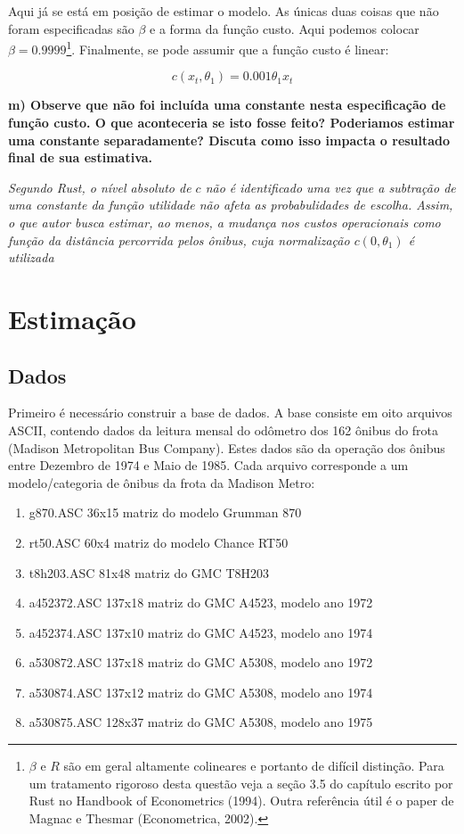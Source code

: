 \documentclass[12pt,a4paper]{article}
\providecommand{\tightlist}{%
  \setlength{\itemsep}{0pt}\setlength{\parskip}{0pt}}
\let\rmarkdownfootnote\footnote%
\def\footnote{\protect\rmarkdownfootnote}
\begin{document}
Aqui já se está em posição de estimar o modelo. As únicas duas coisas
que não foram especificadas são \(\beta\) e a forma da função custo.
Aqui podemos colocar \(\beta = 0.9999\)\footnote{\(\beta\) e \(R\) são
  em geral altamente colineares e portanto de difícil distinção. Para um
  tratamento rigoroso desta questão veja a seção 3.5 do capítulo escrito
  por Rust no Handbook of Econometrics (1994). Outra referência útil é o
  paper de Magnac e Thesmar (Econometrica, 2002).}. Finalmente, se pode
assumir que a função custo é linear:

\[
c (x_t, \theta_1) = 0.001 \theta_1 x_t
\]

\textbf{m) Observe que não foi incluída uma constante nesta
especificação de função custo. O que aconteceria se isto fosse feito?
Poderiamos estimar uma constante separadamente? Discuta como isso
impacta o resultado final de sua estimativa.}

\emph{Segundo Rust, o nível absoluto de \(c\) não é identificado uma vez
que a subtração de uma constante da função utilidade não afeta as
probabulidades de escolha. Assim, o que autor busca estimar, ao menos, a
mudança nos custos operacionais como função da distância percorrida
pelos ônibus, cuja normalização \(c(0,\theta_1)\) é utilizada}

\hypertarget{estimacao}{%
\section{Estimação}\label{estimacao}}

\hypertarget{dados}{%
\subsection{Dados}\label{dados}}

Primeiro é necessário construir a base de dados. A base consiste em oito
arquivos ASCII, contendo dados da leitura mensal do odômetro dos 162
ônibus do frota (Madison Metropolitan Bus Company). Estes dados são da
operação dos ônibus entre Dezembro de 1974 e Maio de 1985. Cada arquivo
corresponde a um modelo/categoria de ônibus da frota da Madison Metro:

\begin{enumerate}
\def\labelenumi{\arabic{enumi}.}
\tightlist
\item
  g870.ASC 36x15 matriz do modelo Grumman 870
\item
  rt50.ASC 60x4 matriz do modelo Chance RT50
\item
  t8h203.ASC 81x48 matriz do GMC T8H203
\item
  a452372.ASC 137x18 matriz do GMC A4523, modelo ano 1972
\item
  a452374.ASC 137x10 matriz do GMC A4523, modelo ano 1974
\item
  a530872.ASC 137x18 matriz do GMC A5308, modelo ano 1972
\item
  a530874.ASC 137x12 matriz do GMC A5308, modelo ano 1974
\item
  a530875.ASC 128x37 matriz do GMC A5308, modelo ano 1975
\end{enumerate}
\end{document}
